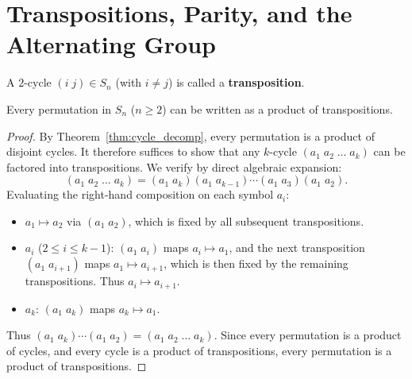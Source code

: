 \section{Transpositions, Parity, and the Alternating Group}
\label{sec:transpositions_alternating}

\begin{definition}[Transposition]
A $2$-cycle $(i \; j) \in S_n$ (with $i \ne j$) is called a \textbf{transposition}.
\end{definition}

\begin{proposition}
\label{prop:transpositions_generate}
Every permutation in $S_n$ ($n \ge 2$) can be written as a product of transpositions.
\end{proposition}

\begin{proof}
By Theorem~\ref{thm:cycle_decomp}, every permutation is a product of disjoint cycles.
It therefore suffices to show that any $k$-cycle $(a_1 \; a_2 \; \dots \; a_k)$ can be factored into transpositions.
We verify by direct algebraic expansion:
\begin{equation}
(a_1 \; a_2 \; \dots \; a_k) = (a_1 \; a_k)(a_1 \; a_{k-1}) \cdots (a_1 \; a_3)(a_1 \; a_2).
\end{equation}
Evaluating the right-hand composition on each symbol $a_i$:
\begin{itemize}[leftmargin=1.5em, itemsep=3pt]
    \item $a_1 \mapsto a_2$ via $(a_1 \; a_2)$, which is fixed by all subsequent transpositions.
    \item $a_i$ ($2 \le i \le k-1$): $(a_1 \; a_i)$ maps $a_i \mapsto a_1$, and the next transposition $(a_1 \; a_{i+1})$ maps $a_1 \mapsto a_{i+1}$, which is then fixed by the remaining transpositions. Thus $a_i \mapsto a_{i+1}$.
    \item $a_k$: $(a_1 \; a_k)$ maps $a_k \mapsto a_1$.
\end{itemize}
Thus $(a_1 \; a_k)\cdots(a_1 \; a_2) = (a_1 \; a_2 \; \dots \; a_k)$.
Since every permutation is a product of cycles, and every cycle is a product of transpositions, every permutation is a product of transpositions.
\end{proof}

